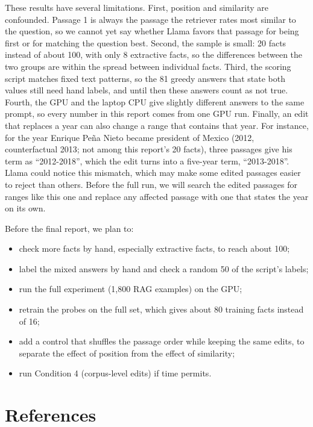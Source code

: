 \documentclass[
  12pt,
  letterpaper,
]{article}
\providecommand{\tightlist}{%
  \setlength{\itemsep}{0pt}\setlength{\parskip}{0pt}}
\begin{document}
These results have several limitations. First,
position and similarity are confounded. Passage 1
is always the passage the retriever rates most
similar to the question, so we cannot yet say
whether Llama favors that passage for being first
or for matching the question best. Second, the
sample is small: 20 facts instead of about 100,
with only 8 extractive facts, so the differences
between the two groups are within the spread
between individual facts. Third, the scoring
script matches fixed text patterns, so the 81
greedy answers that state both values still need
hand labels, and until then these answers count as
not true. Fourth, the GPU and the laptop CPU give
slightly different answers to the same prompt, so
every number in this report comes from one GPU
run. Finally, an edit that replaces a year can
also change a range that contains that year. For
instance, for the year Enrique Peña Nieto became
president of Mexico (2012, counterfactual 2013;
not among this report's 20 facts), three passages
give his term as ``2012-2018'', which the edit
turns into a five-year term, ``2013-2018''. Llama
could notice this mismatch, which may make some
edited passages easier to reject than others.
Before the full run, we will search the edited
passages for ranges like this one and replace any
affected passage with one that states the year on
its own.

Before the final report, we plan to:

\begin{itemize}
\tightlist
\item
  check more facts by hand, especially extractive
  facts, to reach about 100;
\item
  label the mixed answers by hand and check a
  random 50 of the script's labels;
\item
  run the full experiment (1,800 RAG examples) on
  the GPU;
\item
  retrain the probes on the full set, which gives
  about 80 training facts instead of 16;
\item
  add a control that shuffles the passage order
  while keeping the same edits, to separate the
  effect of position from the effect of
  similarity;
\item
  run Condition 4 (corpus-level edits) if time
  permits.
\end{itemize}

\section{References}\label{references}
\end{document}
